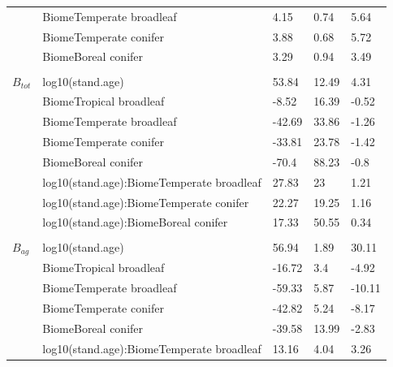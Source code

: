 \documentclass[
]{article}
\begin{document}
\begin{longtable}{lllll}
\hspace{1em} & BiomeTemperate broadleaf & 4.15 & 0.74 & 5.64\\
\hspace{1em} & BiomeTemperate conifer & 3.88 & 0.68 & 5.72\\
\hspace{1em} & BiomeBoreal conifer & 3.29 & 0.94 & 3.49\\
\addlinespace[1em]
\multicolumn{4}{l}{\textbf{}}\\
\hspace{1em}$B_{tot}$ & log10(stand.age) & 53.84 & 12.49 & 4.31\\
\hspace{1em} & BiomeTropical broadleaf & -8.52 & 16.39 & -0.52\\
\hspace{1em} & BiomeTemperate broadleaf & -42.69 & 33.86 & -1.26\\
\hspace{1em} & BiomeTemperate conifer & -33.81 & 23.78 & -1.42\\
\hspace{1em} & BiomeBoreal conifer & -70.4 & 88.23 & -0.8\\
\hspace{1em} & log10(stand.age):BiomeTemperate broadleaf & 27.83 & 23 & 1.21\\
\hspace{1em} & log10(stand.age):BiomeTemperate conifer & 22.27 & 19.25 & 1.16\\
\hspace{1em} & log10(stand.age):BiomeBoreal conifer & 17.33 & 50.55 & 0.34\\
\addlinespace[1em]
\multicolumn{4}{l}{\textbf{}}\\
\hspace{1em}$B_{ag}$ & log10(stand.age) & 56.94 & 1.89 & 30.11\\
\hspace{1em} & BiomeTropical broadleaf & -16.72 & 3.4 & -4.92\\
\hspace{1em} & BiomeTemperate broadleaf & -59.33 & 5.87 & -10.11\\
\hspace{1em} & BiomeTemperate conifer & -42.82 & 5.24 & -8.17\\
\hspace{1em} & BiomeBoreal conifer & -39.58 & 13.99 & -2.83\\
\hspace{1em} & log10(stand.age):BiomeTemperate broadleaf & 13.16 & 4.04 & 3.26\\

\end{longtable}
\end{document}
